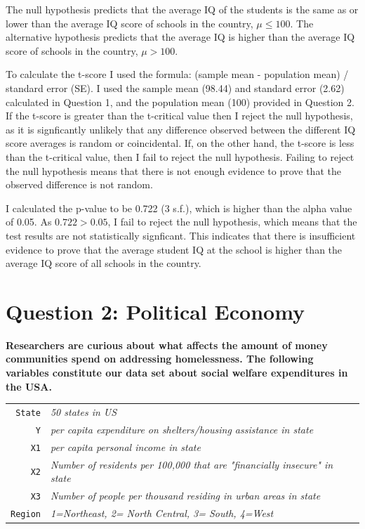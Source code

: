 \documentclass[12pt,letterpaper]{article}
\begin{document}
\begin{enumerate}
	The null hypothesis predicts that the average IQ of the students is the same as or lower than the average IQ score of schools in the country, $\mu \le 100$. The alternative hypothesis predicts that the average IQ is higher than the average IQ score of schools in the country, $\mu > 100$.
	
	To calculate the t-score I used the formula: (sample mean - population mean) / standard error (SE). I used the sample mean (98.44) and standard error (2.62) calculated in Question 1, and the population mean (100) provided in Question 2. If the t-score is greater than the t-critical value then I reject the null hypothesis, as it is signficantly unlikely that any difference observed between the different IQ score averages is random or coincidental. If, on the other hand, the t-score is less than the t-critical value, then I fail to reject the null hypothesis. Failing to reject the null hypothesis means that there is not enough evidence to prove that the observed difference is not random.
	
	
	
	I calculated the p-value to be 0.722 (3 s.f.), which is higher than the alpha value of 0.05. As $0.722 > 0.05$, I fail to reject the null hypothesis, which means that the test results are not statistically signficant. This indicates that there is insufficient evidence to prove that the average student IQ at the school is higher than the average IQ score of all schools in the country.
	
\end{enumerate}

\newpage

	\section*{Question 2: Political Economy}

\noindent \textbf{Researchers are curious about what affects the amount of money communities spend on addressing homelessness. The following variables constitute our data set about social welfare expenditures in the USA. }\\
\vspace{.5cm}


\begin{tabular}{r|l}
	\texttt{State} &\emph{50 states in US} \\
	\texttt{Y} & \emph{per capita expenditure on shelters/housing assistance in state}\\
	\texttt{X1} &\emph{per capita personal income in state} \\
	\texttt{X2} &  \emph{Number of residents per 100,000 that are "financially insecure" in state}\\
	\texttt{X3} &  \emph{Number of people per thousand residing in urban areas in state} \\
	\texttt{Region} &  \emph{1=Northeast, 2= North Central, 3= South, 4=West} \\
\end{tabular}
\end{document}
